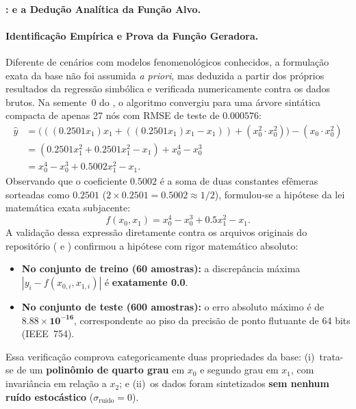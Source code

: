 \paragraph{:  e a Dedução Analítica da Função Alvo.}
\label{sec:melhor_synth1}

\paragraph{Identificação Empírica e Prova da Função Geradora.}
Diferente de cenários com modelos fenomenológicos conhecidos, a formulação exata
da base  não foi assumida \emph{a priori}, mas deduzida a partir dos
próprios resultados da regressão simbólica e verificada numericamente contra os
dados brutos. Na semente~0 do , o algoritmo convergiu para uma
árvore sintática compacta de apenas 27 nós com RMSE de teste de $\mathbf{0.000576}$:
\begin{align}
  \hat{y} &= \big(((0.2501 x_1) x_1 + ((0.2501 x_1) x_1 - x_1)) + (x_0^2 \cdot x_0^2)\big) - (x_0 \cdot x_0^2) \nonumber \\
          &= (0.2501 x_1^2 + 0.2501 x_1^2 - x_1) + x_0^4 - x_0^3 \nonumber \\
          &= x_0^4 - x_0^3 + 0.5002 x_1^2 - x_1.
  \label{eq:synth1_expr}
\end{align}
Observando que o coeficiente $0.5002$ é a soma de duas constantes efêmeras
sorteadas como $0.2501$ ($2 \times 0.2501 = 0.5002 \approx 1/2$), formulou-se a
hipótese da lei matemática exata subjacente:
\begin{equation}
  f(x_0, x_1) = x_0^4 - x_0^3 + 0.5 x_1^2 - x_1.
  \label{eq:synth1_ground_truth}
\end{equation}
A validação dessa expressão diretamente contra os arquivos originais do repositório
(\allowbreak{} e \allowbreak{}) confirmou a hipótese com rigor
matemático absoluto:
\begin{itemize}
  \item \textbf{No conjunto de treino (60 amostras):} a discrepância máxima
        $|y_i - f(x_{0,i}, x_{1,i})|$ é \textbf{exatamente 0.0}.
  \item \textbf{No conjunto de teste (600 amostras):} o erro absoluto máximo é de
        $\mathbf{8.88 \times 10^{-16}}$, correspondente ao piso da precisão de
        ponto flutuante de 64 bits (IEEE~754).
\end{itemize}
Essa verificação comprova categoricamente duas propriedades da base:
(i)~trata-se de um \textbf{polinômio de quarto grau} em $x_0$ e segundo grau em $x_1$,
com invariância em relação a $x_2$; e
(ii)~os dados foram sintetizados \textbf{sem nenhum ruído estocástico} ($\sigma_{\text{ruído}} = 0$).

